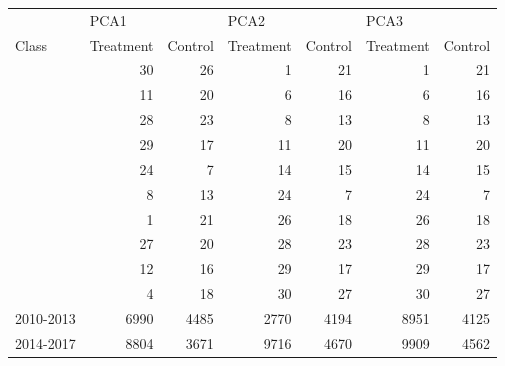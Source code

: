 \documentclass{mcmthesis}
\begin{document}
\begin{appendices}
\begin{table}[htbp]
    \begin{tabular}{lrrrrrr}
          & \multicolumn{1}{l}{PCA1} &       & \multicolumn{1}{l}{PCA2} &       & \multicolumn{1}{l}{PCA3} &  \\
    Class & \multicolumn{1}{l}{Treatment} & \multicolumn{1}{l}{Control} & \multicolumn{1}{l}{Treatment} & \multicolumn{1}{l}{Control} & \multicolumn{1}{l}{Treatment} & \multicolumn{1}{l}{Control} \\
          & 30    & 26    & 1     & 21    & 1     & 21 \\
          & 11    & 20    & 6     & 16    & 6     & 16 \\
          & 28    & 23    & 8     & 13    & 8     & 13 \\
          & 29    & 17    & 11    & 20    & 11    & 20 \\
          & 24    & 7     & 14    & 15    & 14    & 15 \\
          & 8     & 13    & 24    & 7     & 24    & 7 \\
          & 1     & 21    & 26    & 18    & 26    & 18 \\
          & 27    & 20    & 28    & 23    & 28    & 23 \\
          & 12    & 16    & 29    & 17    & 29    & 17 \\
          & 4     & 18    & 30    & 27    & 30    & 27 \\
    2010-2013 & 6990  & 4485  & 2770  & 4194  & 8951  & 4125 \\
    2014-2017 & 8804  & 3671  & 9716  & 4670  & 9909  & 4562 \\
    \end{tabular}%
  \label{tab:addlabel}%
\end{table}%
\begin{table}[htbp]
  \centering


\end{table}
\end{appendices}
\end{document}
